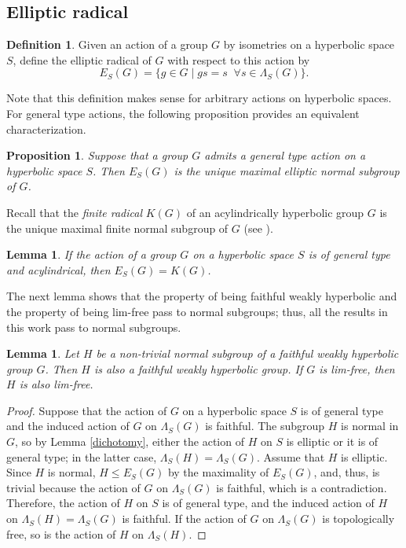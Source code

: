 \documentclass[11pt,letterpaper]{article}
\newtheorem{lem}[thm]{Lemma}
\newtheorem{prop}[thm]{Proposition}
\theoremstyle{definition}
\newtheorem{defn}[thm]{Definition}
\theoremstyle{remark}
\begin{document}
\subsection{Elliptic radical} \label{elliptic radical}

\begin{defn}\cite{Osi17}
Given an action of a group $G$ by isometries on a hyperbolic space $S$, define the elliptic radical of $G$ with respect to this action by
$$
E_S(G)=\{g \in G \mid g s=s  \; \; \forall s \in \Lambda_S(G)\}.
$$
\end{defn}

Note that this definition makes sense for arbitrary actions on hyperbolic spaces. For general type actions, the following proposition provides an equivalent characterization.

\begin{prop}\cite[Proposition 3.4]{Osi17}\label{elliptic radical is maximal}
Suppose that a group $G$ admits a general type action on a hyperbolic space $S$. Then $E_S(G)$ is the unique maximal elliptic normal subgroup of $G$.
\end{prop}


Recall that the {\it finite radical} $K(G)$ of an acylindrically hyperbolic group $G$ is the unique maximal finite normal subgroup of $G$ (see \cite[Thm 6.14]{DGO}). 

\begin{lem}\cite[Lemma 3.7]{BH}\label{E(G)=K(G)}
If the action of a group $G$ on a hyperbolic space $S$ is of general type and acylindrical, then $E_S(G)=K(G)$.
\end{lem}

The next lemma shows that the property of being faithful weakly hyperbolic and the property of being lim-free pass to normal subgroups; thus, all the results in this work pass to normal subgroups.

\begin{lem}\label{lim-free passes to normal subgroups}
Let $H$ be a non-trivial normal subgroup of a faithful weakly hyperbolic group $G$. Then $H$ is also a faithful weakly hyperbolic group. If $G$ is lim-free, then $H$ is also lim-free.
\end{lem}
\begin{proof}
Suppose that the action of $G$ on a hyperbolic space $S$ is of general type and the induced action of $G$ on $\Lambda_S(G)$ is faithful. The subgroup $H$ is normal in $G$, so by Lemma \ref{dichotomy}, either the action of $H$ on $S$ is elliptic or it is of general type; in the latter case, $\Lambda_S(H)=\Lambda_S(G)$. Assume that $H$ is elliptic. Since $H$ is normal, $ H\leq E_S(G)$ by the maximality of $E_S(G)$, and, thus, is trivial because the action of $ G$ on $\Lambda_S(G)$ is faithful, which is a contradiction. Therefore, the action of $H$ on $S$ is of general type, and the induced action of $H$ on $\Lambda_S(H)=\Lambda_S(G)$ is faithful. If the action of $G$ on $\Lambda_S(G)$ is topologically free, so is the action of $H$ on $\Lambda_S(H)$.  
\end{proof}
\end{document}
